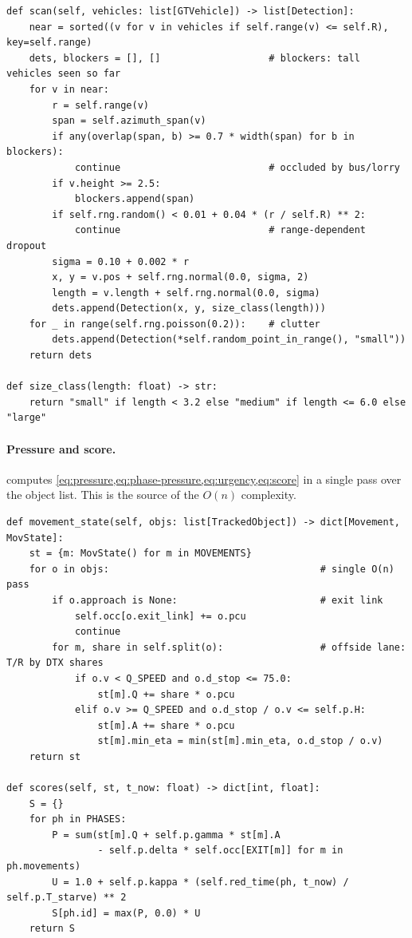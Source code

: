 \begin{lstlisting}[style=py,caption={Noisy, occluded LiDAR scan (\texttt{sensing/virtual\_lidar.py})},label={lst:impl-vls}]
def scan(self, vehicles: list[GTVehicle]) -> list[Detection]:
    near = sorted((v for v in vehicles if self.range(v) <= self.R), key=self.range)
    dets, blockers = [], []                   # blockers: tall vehicles seen so far
    for v in near:
        r = self.range(v)
        span = self.azimuth_span(v)
        if any(overlap(span, b) >= 0.7 * width(span) for b in blockers):
            continue                          # occluded by bus/lorry
        if v.height >= 2.5:
            blockers.append(span)
        if self.rng.random() < 0.01 + 0.04 * (r / self.R) ** 2:
            continue                          # range-dependent dropout
        sigma = 0.10 + 0.002 * r
        x, y = v.pos + self.rng.normal(0.0, sigma, 2)
        length = v.length + self.rng.normal(0.0, sigma)
        dets.append(Detection(x, y, size_class(length)))
    for _ in range(self.rng.poisson(0.2)):    # clutter
        dets.append(Detection(*self.random_point_in_range(), "small"))
    return dets

def size_class(length: float) -> str:
    return "small" if length < 3.2 else "medium" if length <= 6.0 else "large"
\end{lstlisting}

\paragraph{Pressure and score.}  computes \cref{eq:pressure,eq:phase-pressure,eq:urgency,eq:score}
in a single pass over the object list. This is the source of the $O(n)$ complexity.

\begin{lstlisting}[style=py,caption={Movement pressure and phase score (\texttt{control/prism.py})},label={lst:impl-pressure}]
def movement_state(self, objs: list[TrackedObject]) -> dict[Movement, MovState]:
    st = {m: MovState() for m in MOVEMENTS}
    for o in objs:                                     # single O(n) pass
        if o.approach is None:                         # exit link
            self.occ[o.exit_link] += o.pcu
            continue
        for m, share in self.split(o):                 # offside lane: T/R by DTX shares
            if o.v < Q_SPEED and o.d_stop <= 75.0:
                st[m].Q += share * o.pcu
            elif o.v >= Q_SPEED and o.d_stop / o.v <= self.p.H:
                st[m].A += share * o.pcu
                st[m].min_eta = min(st[m].min_eta, o.d_stop / o.v)
    return st

def scores(self, st, t_now: float) -> dict[int, float]:
    S = {}
    for ph in PHASES:
        P = sum(st[m].Q + self.p.gamma * st[m].A
                - self.p.delta * self.occ[EXIT[m]] for m in ph.movements)
        U = 1.0 + self.p.kappa * (self.red_time(ph, t_now) / self.p.T_starve) ** 2
        S[ph.id] = max(P, 0.0) * U
    return S
\end{lstlisting}

